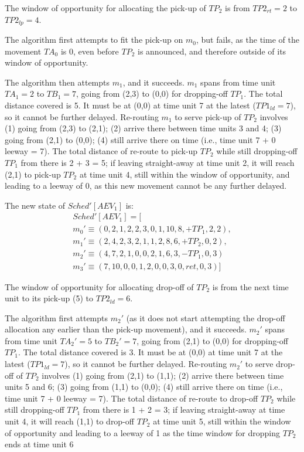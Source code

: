 The window of opportunity for allocating the pick-up of $TP_2$ is from $TP2_{rt} = 2$ to $TP2_{lp} = 4$. 

The algorithm first attempts to fit the pick-up on $m_0$, but fails, as the time of the movement $TA_0$ is 0, even before $TP_2$ is announced, and therefore outside of its window of opportunity.  

The algorithm then attempts $m_1$, and it succeeds. $m_1$ spans from time unit $TA_1 = 2$ to $TB_1 = 7$, going from (2,3) to (0,0) for dropping-off $TP_1$.  The total distance covered is 5. It must be at (0,0) at time unit 7 at the latest ($TP1_{ld} = 7$), so it cannot be further delayed.  Re-routing $m_1$ to serve pick-up of $TP_2$ involves (1) going from (2,3) to (2,1); (2) arrive there between time units 3 and 4; (3) going from (2,1) to (0,0); (4) still arrive there on time (i.e., time unit 7 + 0 leeway = 7). The total distance of re-route to pick-up $TP_2$ while still dropping-off $TP_1$ from there is 2 + 3 = 5; if leaving straight-away at time unit 2, it will reach (2,1) to pick-up $TP_2$ at time unit 4, still within the window of opportunity, and leading to a leeway of 0, as this new movement cannot be any further delayed. 

The new state of $Sched'[AEV_1]$ is: 
\begin{align*}
Sched'[AEV_1] = [\\
m_0' \equiv ( 0, 2, 1, 2, 2, 3, 0, 1, 10, 8, +TP_1, 2, 2 ),\\
m_1' \equiv ( 2, 4, 2, 3, 2, 1, 1, 2, 8, 6, +TP_2, 0, 2 ),\\
m_2' \equiv ( 4, 7, 2, 1, 0, 0, 2, 1, 6, 3, -TP_1, 0, 3 )\\ 
m_3' \equiv ( 7, 10, 0, 0, 1, 2, 0, 0, 3, 0, ret, 0, 3 )]										 
\end{align*}	

The window of opportunity for allocating drop-off of $TP_2$ is from the next time unit to its pick-up (5) to $TP2_{ld} = 6$. 

The algorithm first attempts $m_2'$ (as it does not start attempting the drop-off allocation any earlier than the pick-up movement), and it succeeds.  $m_2'$ spans from time unit $TA_2' = 5$ to $TB_2' = 7$, going from (2,1) to (0,0) for dropping-off $TP_1$.  The total distance covered is 3. It must be at (0,0) at time unit 7 at the latest ($TP1_{ld} = 7$), so it cannot be further delayed.  Re-routing $m_2'$ to serve drop-off of $TP_2$ involves (1) going from (2,1) to (1,1); (2) arrive there between time units 5 and 6; (3) going from (1,1) to (0,0); (4) still arrive there on time (i.e., time unit 7 + 0 leeway = 7). The total distance of re-route to drop-off $TP_2$ while still dropping-off $TP_1$ from there is 1 + 2 = 3; if leaving straight-away at time unit 4, it will reach (1,1) to drop-off $TP_2$ at time unit 5, still within the window of opportunity and leading to a leeway of 1 as the time window for dropping $TP_2$ ends at time unit 6 

